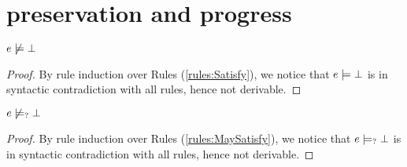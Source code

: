 \section{preservation and progress}

\begin{lem}
  \label{lem:no-e-satisfy-falsity}
  $e \not\models \bot$
\end{lem}
\begin{proof}
  By rule induction over Rules (\ref{rules:Satisfy}), we notice that $e \models \bot$ is in syntactic contradiction with all rules, hence not derivable.
\end{proof}

\begin{lem}
  \label{lem:no-e-may-satisfy-falsity}
  $e \not\models_{?} \bot$
\end{lem}
\begin{proof}
  By rule induction over Rules (\ref{rules:MaySatisfy}), we notice that $e \models_{?} \bot$ is in syntactic contradiction with all rules, hence not derivable.
\end{proof}

